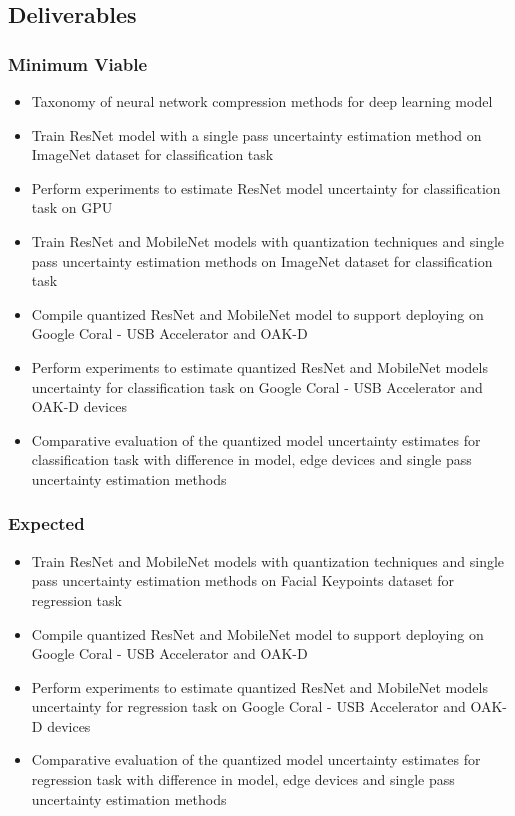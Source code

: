 \documentclass[rnd]{mas_proposal}
\begin{document}
\subsection{Deliverables}

\subsubsection*{Minimum Viable}
\begin{itemize}
    \item Taxonomy of neural network compression methods for deep learning model
    \item Train ResNet model with a single pass uncertainty estimation method on ImageNet dataset for classification task
    \item Perform experiments to estimate ResNet model uncertainty for classification task on GPU
    \item Train ResNet and MobileNet models with quantization techniques and single pass uncertainty estimation methods on ImageNet dataset for classification task
    \item Compile quantized ResNet and MobileNet model to support deploying on Google Coral - USB Accelerator and OAK-D
    \item Perform experiments to estimate quantized ResNet and MobileNet models uncertainty for classification task on Google Coral - USB Accelerator and OAK-D devices
    \item Comparative evaluation of the quantized model uncertainty estimates for classification task with difference in model, edge devices and single pass uncertainty estimation methods
\end{itemize}

\subsubsection*{Expected}
\begin{itemize}
    \item Train ResNet and MobileNet models with quantization techniques and single pass uncertainty estimation methods on Facial Keypoints dataset for regression task
    \item Compile quantized ResNet and MobileNet model to support deploying on Google Coral - USB Accelerator and OAK-D 
    \item Perform experiments to estimate quantized ResNet and MobileNet models uncertainty for regression task on Google Coral - USB Accelerator and OAK-D devices
    \item Comparative evaluation of the quantized model uncertainty estimates for regression task with difference in model, edge devices and single pass uncertainty estimation methods
    \end{itemize}
\end{document}

